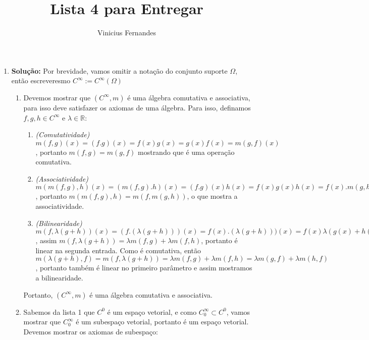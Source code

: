 \documentclass{article}
\begin{document}
	
	\title{Lista 4 para Entregar}
	\author{Vinicius Fernandes}
	
	\maketitle
	
	\begin{enumerate}
		
		\item[3.] \textbf{Solução:} Por brevidade, vamos omitir a notação do conjunto suporte $\Omega$, então escreveresmo $C^{\infty} := C^{\infty}(\Omega)$
		\begin{enumerate}
			\item Devemos mostrar que $(C^{\infty}, m)$ é uma álgebra comutativa e associativa, para isso deve satisfazer os axiomas de uma álgebra. Para isso, definamos $f, g, h \in C^{\infty}$ e $\lambda \in \mathbb{R}$:
			
			\begin{enumerate}
				\item \textit{(Comutatividade)} $m(f, g)(x) = (f.g)(x) = f(x)g(x) = g(x)f(x) = m(g,f)(x)$, portanto $m(f,g) = m(g,f)$ mostrando que é uma operação comutativa. 
				
				\item \textit{(Associatividade)} $m(m(f,g), h)(x) = (m(f, g).h)(x) = (f.g)(x)h(x) = f(x)g(x)h(x) = f(x).m(g,h)(x) = m(f, m(g,h))(x)$, portanto $m(m(f,g), h)=m(f, m(g,h))$, o que mostra a associatividade.
				
				\item \textit{(Bilinearidade)} $m(f, \lambda(g + h))(x) = (f.( \lambda(g + h)))(x)  = f(x).( \lambda(g + h)))(x) = f(x) \lambda(g(x) + h(x)) = \lambda f(x) g(x) + \lambda  f(x)h(x) = \lambda m(f, g)(x) + \lambda m(f,h)(x)$, assim $m(f, \lambda(g + h)) = \lambda m(f,g) + \lambda m(f,h)$, portanto é linear na segunda entrada. Como é comutativa, então $m(\lambda(g + h), f) = m(f, \lambda(g + h)) = \lambda m(f,g) + \lambda m(f,h) = \lambda m(g,f) + \lambda m(h,f)$, portanto também é linear no primeiro parâmetro e assim mostramos a bilinearidade.
				
			\end{enumerate}
			Portanto, $(C^{\infty}, m)$ é uma álgebra comutativa e associativa. 
		
			\item Sabemos da lista 1 que $C^{0}$ é um espaço vetorial, e como $C^{\infty}_{0} \subset C^{0}$, vamos mostrar que $C^{\infty}_{0}$ é um subespaço vetorial, portanto é um espaço vetorial. Devemos mostrar os axiomas de subespaço:
			

\end{enumerate}
\end{enumerate}
\end{document}
